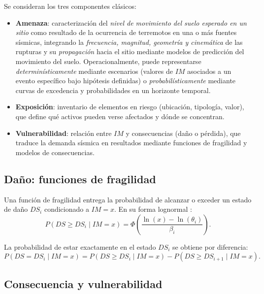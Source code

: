 Se consideran los tres componentes clásicos:
\begin{itemize}
    \item \textbf{Amenaza}: caracterización del \textit{nivel de movimiento del suelo esperado en un sitio} como resultado de la ocurrencia de terremotos en una o más fuentes sísmicas, integrando la \textit{frecuencia, magnitud, geometría y cinemática} de las rupturas y su \textit{propagación} hacia el sitio mediante modelos de predicción del movimiento del suelo. Operacionalmente, puede representarse \textit{determinísticamente} mediante escenarios (valores de \(IM\) asociados a un evento específico bajo hipótesis definidas) o \textit{probabilísticamente} mediante curvas de excedencia y probabilidades en un horizonte temporal.
    \item \textbf{Exposición}: inventario de elementos en riesgo (ubicación, tipología, valor), que define qué activos pueden verse afectados y dónde se concentran.
    \item \textbf{Vulnerabilidad}: relación entre \(IM\) y consecuencias (daño o pérdida), que traduce la demanda sísmica en resultados mediante funciones de fragilidad y modelos de consecuencias.
\end{itemize}

\subsection{Daño: funciones de fragilidad}

Una función de fragilidad entrega la probabilidad de alcanzar o exceder un estado de daño \(DS_i\) condicionado a \(IM=x\). En su forma lognormal \cite{BakerBradleyStafford2021}:
\begin{equation}
P(DS \geq DS_i \mid IM = x) = \Phi\left(\frac{\ln(x) - \ln(\theta_i)}{\beta_i}\right).
\label{eq:fragility_function_v2}
\end{equation}

La probabilidad de estar exactamente en el estado \(DS_i\) se obtiene por diferencia:
\begin{equation}
P(DS = DS_i \mid IM = x) = P(DS \geq DS_i \mid IM = x) - P(DS \geq DS_{i+1} \mid IM = x).
\label{eq:exact_damage_state_v2}
\end{equation}


\subsection{Consecuencia y vulnerabilidad}

